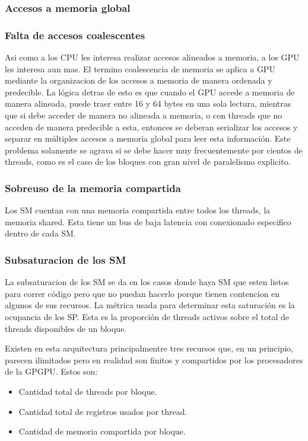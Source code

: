 \subsubsection{Accesos a memoria global}

\subsubsection{Falta de accesos coalescentes}
Asi como a los CPU les interesa realizar accesos alineados a memoria, a los GPU les
interesa aun mas. El termino coalescencia de memoria se aplica a GPU mediante
la organizacion de los accesos a memoria de manera ordenada y predecible. La l\'ogica
detras de esto es que cuando el GPU accede a memoria de manera alineada, puede traer
entre 16 y 64 bytes en una sola lectura, mientras que si debe acceder de manera no
alineada a memoria, o con threads que no acceden de manera predecible a esta, entonces
se deberan serializar los accesos y separar en m\'ultiples accesos a memoria global para leer
esta informaci\'on. Este problema solamente se agrava si se debe hacer muy frecuentemente
por cientos de threads, como es el caso de los bloques con gran nivel de paralelismo explicito.

\subsubsection{Sobreuso de la memoria compartida}

Los SM cuentan con una memoria compartida entre todos los threads, la memoria shared. Esta
tiene un bus de baja latencia con conexionado especifico dentro de cada SM.

\subsubsection{Subsaturacion de los SM}
La subsaturacion de los SM se da en los casos donde haya SM que esten listos para correr
c\'odigo pero que no puedan hacerlo porque tienen contencion en algunos de sus recursos.
La m\'etrica usada para determinar esta saturaci\'on es la ocupancia de los SP.
Esta es la proporci\'on de threads activos sobre el total de threads disponibles de un bloque.

Existen en esta arquitectura principalmentre tres recursos que, en un principio, parecen
ilimitados pero en realidad son finitos y compartidos por los procesadores de la GPGPU.
Estos son:
\begin{itemize}
\item Cantidad total de threads por bloque.
\item Cantidad total de registros usados por thread.
\item Cantidad de memoria compartida por bloque.
\end{itemize}

